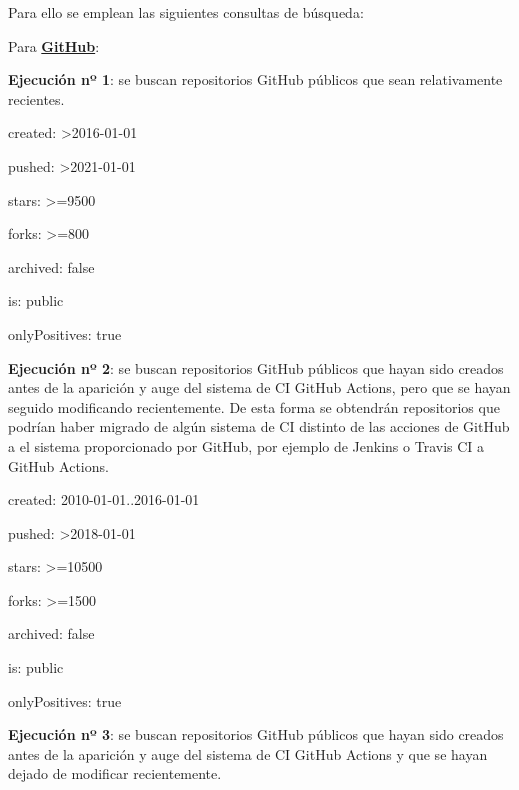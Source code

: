 Para ello se emplean las siguientes consultas de búsqueda:
\begin{compactitem}
    \item Para \textbf{\underline{GitHub}}:
    \begin{compactitem}
        \item \textbf{Ejecución nº 1}: se buscan repositorios GitHub públicos que sean relativamente recientes.
        \begin{compactitem}
            \item created: \textgreater2016-01-01
            \item pushed: \textgreater2021-01-01
            \item stars: \textgreater=9500
            \item forks: \textgreater=800
            \item archived: false
            \item is: public
            \item onlyPositives: true
        \end{compactitem}
        \item \textbf{Ejecución nº 2}: se buscan repositorios GitHub públicos que hayan sido creados antes de la aparición y auge del sistema de CI GitHub Actions, pero que se hayan seguido modificando recientemente. De esta forma se obtendrán repositorios que podrían haber migrado de algún sistema de CI distinto de las acciones de GitHub a el sistema proporcionado por GitHub, por ejemplo de Jenkins o Travis CI a GitHub Actions.
        \begin{compactitem}
            \item created: 2010-01-01..2016-01-01
            \item pushed: \textgreater2018-01-01
            \item stars: \textgreater=10500
            \item forks: \textgreater=1500
            \item archived: false
            \item is: public
            \item onlyPositives: true
        \end{compactitem}
        \item \textbf{Ejecución nº 3}: se buscan repositorios GitHub públicos que hayan sido creados antes de la aparición y auge del sistema de CI GitHub Actions y que se hayan dejado de modificar recientemente.
        \begin{compactitem}

\end{compactitem}
\end{compactitem}
\end{compactitem}
